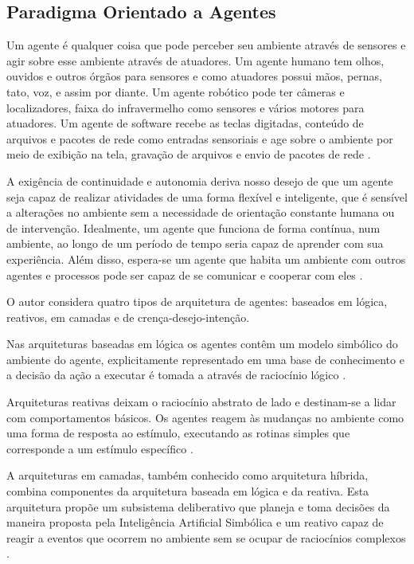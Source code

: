 \subsection{Paradigma Orientado a Agentes}

Um agente é qualquer coisa que pode perceber seu ambiente através de sensores e agir sobre esse ambiente através de atuadores. Um agente humano tem olhos, ouvidos e outros órgãos para sensores e como atuadores possui mãos, pernas, tato, voz, e assim por diante. Um agente robótico pode ter câmeras e localizadores, faixa do infravermelho como sensores e vários motores para atuadores. Um agente de software recebe as teclas digitadas, conteúdo de arquivos e pacotes de rede como entradas sensoriais e age sobre o ambiente por meio de exibição na tela, gravação de arquivos e envio de pacotes de rede \cite[pág.~34]{russel1995}.

A exigência de continuidade e autonomia deriva nosso desejo de que um agente seja capaz de realizar atividades de uma forma flexível e inteligente, que é sensível a alterações no ambiente sem a necessidade de orientação constante humana ou de intervenção. Idealmente, um agente que funciona de forma contínua, num ambiente, ao longo de um período de tempo seria capaz de aprender com sua experiência. Além  disso, espera-se um agente que habita um ambiente com outros agentes e processos pode ser capaz de se comunicar e cooperar com eles \cite[pág.~8]{bradshaw1997}.

O autor  considera quatro tipos de arquitetura de  agentes: baseados em lógica, reativos, em camadas e de crença-desejo-intenção.

\begin{citacao}
Nas arquiteturas baseadas em lógica os agentes contêm um modelo simbólico do ambiente do agente, explicitamente representado em uma base de conhecimento e a decisão da ação a executar é tomada a através de raciocínio lógico \cite[pág.~3]{girardi2004}.
\end{citacao}

Arquiteturas reativas deixam o raciocínio abstrato de lado e destinam-se a lidar com comportamentos básicos. Os agentes reagem às mudanças no ambiente como uma forma de resposta ao estímulo, executando as rotinas simples que corresponde a um estímulo específico \cite[pág.~13]{schumacher2001}.

A arquiteturas em camadas, também conhecido como arquitetura híbrida, combina componentes da arquitetura baseada em lógica e da reativa. Esta arquitetura propõe um subsistema deliberativo que planeja e toma decisões da maneira proposta pela Inteligência Artificial Simbólica e um reativo capaz de reagir a eventos que ocorrem no ambiente sem se ocupar de raciocínios complexos \cite[pág.~44]{ferreira2004}.

